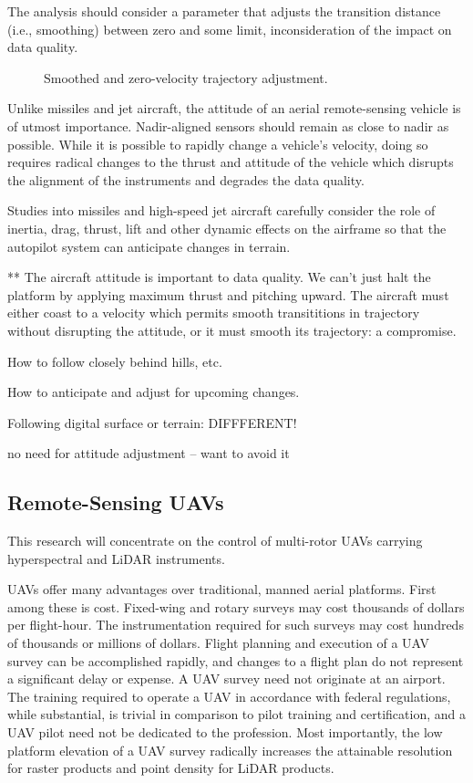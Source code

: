 \documentclass[10pt,a4paper]{report}
\begin{document}
The analysis should consider a parameter that adjusts the transition distance (i.e., smoothing) between zero and some limit, inconsideration of the impact on data quality.

\begin{figure}
\centering
\def\svgscale{0.5}

\caption{Smoothed and zero-velocity trajectory adjustment.}
\label{fig:uav_smooth_traj}
\end{figure}

Unlike missiles and jet aircraft, the attitude of an aerial remote-sensing vehicle is of utmost importance. Nadir-aligned sensors should remain as close to nadir as possible. While it is possible to rapidly change a vehicle's velocity, doing so requires radical changes to the thrust and attitude of the vehicle which disrupts the alignment of the instruments and degrades the data quality.



Studies into missiles and high-speed jet aircraft carefully consider the role of inertia, drag, thrust, lift and other dynamic effects on the airframe so that the autopilot system can anticipate changes in terrain. 

** The aircraft attitude is important to data quality. We can't just halt the platform by applying maximum thrust and pitching upward. The aircraft must either coast to a velocity which permits smooth transititions in trajectory without disrupting the attitude, or it must smooth its trajectory: a compromise.



How to follow closely behind hills, etc. 

How to anticipate and adjust for upcoming changes.

Following digital surface or terrain: DIFFFERENT!

no need for attitude adjustment -- want to avoid it




\subsection{Remote-Sensing UAVs}

This research will concentrate on the control of multi-rotor UAVs carrying hyperspectral and LiDAR instruments.

UAVs offer many advantages over traditional, manned aerial platforms. First among these is cost. Fixed-wing and rotary surveys may cost thousands of dollars per flight-hour. The instrumentation required for such surveys may cost hundreds of thousands or millions  of dollars. Flight planning and execution of a UAV survey can be accomplished rapidly, and changes to a flight plan do not represent a significant delay or expense. A UAV survey need not originate at an airport. The training required to operate a UAV in accordance with federal regulations, while substantial, is trivial in comparison to pilot training and certification, and a UAV pilot need not be dedicated to the profession. Most importantly, the low platform elevation of a UAV survey radically increases the attainable resolution for raster products and point density for LiDAR products.
\end{document}
